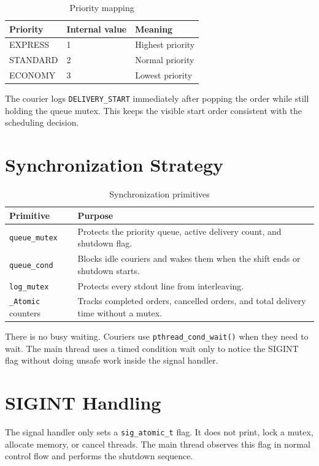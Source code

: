 \documentclass[11pt,a4paper]{article}
\begin{document}
\begin{table}[H]
\centering
\begin{tabular}{lll}
\toprule
Priority & Internal value & Meaning\\
\midrule
EXPRESS & 1 & Highest priority\\
STANDARD & 2 & Normal priority\\
ECONOMY & 3 & Lowest priority\\
\bottomrule
\end{tabular}
\caption{Priority mapping}
\end{table}

The courier logs \texttt{DELIVERY\_START} immediately after popping the order while still holding the queue mutex. This keeps the visible start order consistent with the scheduling decision.

\section{Synchronization Strategy}

\begin{table}[H]
\centering
\begin{tabular}{p{4cm}p{9cm}}
\toprule
Primitive & Purpose\\
\midrule
\texttt{queue\_mutex} & Protects the priority queue, active delivery count, and shutdown flag.\\
\texttt{queue\_cond} & Blocks idle couriers and wakes them when the shift ends or shutdown starts.\\
\texttt{log\_mutex} & Protects every stdout line from interleaving.\\
\texttt{\_Atomic} counters & Tracks completed orders, cancelled orders, and total delivery time without a mutex.\\
\bottomrule
\end{tabular}
\caption{Synchronization primitives}
\end{table}

There is no busy waiting. Couriers use \texttt{pthread\_cond\_wait()} when they need to wait. The main thread uses a timed condition wait only to notice the SIGINT flag without doing unsafe work inside the signal handler.

\section{SIGINT Handling}

The signal handler only sets a \texttt{sig\_atomic\_t} flag. It does not print, lock a mutex, allocate memory, or cancel threads. The main thread observes this flag in normal control flow and performs the shutdown sequence.
\end{document}
